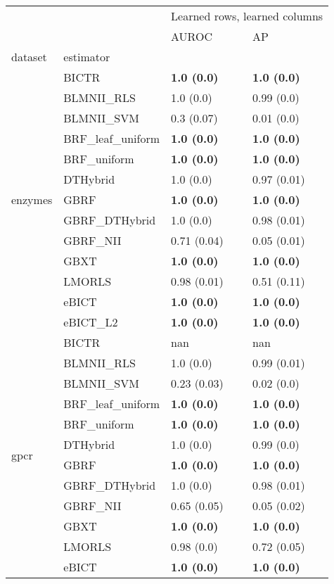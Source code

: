 \begin{tabular}{llll}
\toprule
 &  & \multicolumn{2}{r}{Learned rows, learned columns} \\
 &  & AUROC & AP \\
dataset & estimator &  &  \\
\midrule
\multirow[c]{13}{*}{enzymes} & BICTR & \textbf{1.0 (0.0)} & \textbf{1.0 (0.0)} \\
 & BLMNII\_RLS & 1.0 (0.0) & 0.99 (0.0) \\
 & BLMNII\_SVM & 0.3 (0.07) & 0.01 (0.0) \\
 & BRF\_leaf\_uniform & \textbf{1.0 (0.0)} & \textbf{1.0 (0.0)} \\
 & BRF\_uniform & \textbf{1.0 (0.0)} & \textbf{1.0 (0.0)} \\
 & DTHybrid & 1.0 (0.0) & 0.97 (0.01) \\
 & GBRF & \textbf{1.0 (0.0)} & \textbf{1.0 (0.0)} \\
 & GBRF\_DTHybrid & 1.0 (0.0) & 0.98 (0.01) \\
 & GBRF\_NII & 0.71 (0.04) & 0.05 (0.01) \\
 & GBXT & \textbf{1.0 (0.0)} & \textbf{1.0 (0.0)} \\
 & LMORLS & 0.98 (0.01) & 0.51 (0.11) \\
 & eBICT & \textbf{1.0 (0.0)} & \textbf{1.0 (0.0)} \\
 & eBICT\_L2 & \textbf{1.0 (0.0)} & \textbf{1.0 (0.0)} \\
\cline{1-2}
\multirow[c]{13}{*}{gpcr} & BICTR & nan & nan \\
 & BLMNII\_RLS & 1.0 (0.0) & 0.99 (0.01) \\
 & BLMNII\_SVM & 0.23 (0.03) & 0.02 (0.0) \\
 & BRF\_leaf\_uniform & \textbf{1.0 (0.0)} & \textbf{1.0 (0.0)} \\
 & BRF\_uniform & \textbf{1.0 (0.0)} & \textbf{1.0 (0.0)} \\
 & DTHybrid & 1.0 (0.0) & 0.99 (0.0) \\
 & GBRF & \textbf{1.0 (0.0)} & \textbf{1.0 (0.0)} \\
 & GBRF\_DTHybrid & 1.0 (0.0) & 0.98 (0.01) \\
 & GBRF\_NII & 0.65 (0.05) & 0.05 (0.02) \\
 & GBXT & \textbf{1.0 (0.0)} & \textbf{1.0 (0.0)} \\
 & LMORLS & 0.98 (0.0) & 0.72 (0.05) \\
 & eBICT & \textbf{1.0 (0.0)} & \textbf{1.0 (0.0)} \\

\end{tabular}
